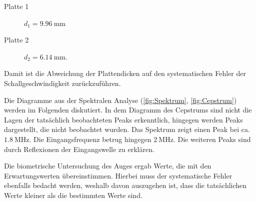 \begin{description}
  \item[Platte 1] $d_1 = \SI{9.96}{\milli\meter}$
  \item[Platte 2] $d_2 = \SI{6.14}{\milli\meter}$.
\end{description}

Damit ist die Abweichung der Plattendicken auf den systematischen Fehler
der Schallgeschwindigkeit zurückzuführen.

Die Diagramme aus der Spektralen Analyse (\ref{fig:Spektrum}, \ref{fig:Cepstrum})
werden im Folgenden diskutiert. In dem Diagramm des Cepstrums sind nicht die Lagen der tatsächlich
beobachteten Peaks erkenntlich, hingegen werden Peaks dargestellt, die
nicht beobachtet wurden. Das Spektrum zeigt einen Peak bei ca. $\SI{1.8}{\mega\hertz}$.
Die Eingangsfrequenz betrug hingegen $\SI{2}{\mega\hertz}$. Die weiteren Peaks
sind durch Reflexionen der Eingangswelle zu erklären.

Die biometrische Untersuchung des Auges ergab Werte, die
mit den Erwartungswerten übereinstimmen. Hierbei muss der
systematische Fehler ebenfalls bedacht werden, weshalb davon auszugehen
ist, dass die tatsächlichen Werte kleiner als die bestimmten Werte sind.
